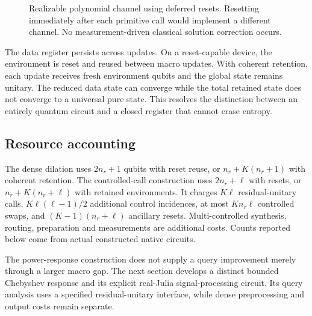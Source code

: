 \documentclass{ieeeaccess}
\newcommand{\ket}[1]{\lvert #1\rangle}\newcommand{\bra}[1]{\langle #1\rvert}
\begin{document}
\begin{figure}[!tbp]\centering
{}
\caption{Realizable polynomial channel using deferred resets. Resetting immediately after each primitive call would implement a different channel. No measurement-driven classical solution correction occurs.}\label{fig:architecture}
\end{figure}

The data register persists across updates. On a reset-capable device, the environment is reset and reused between macro updates. With coherent retention, each update receives fresh environment qubits and the global state remains unitary. The reduced data state can converge while the total retained state does not converge to a universal pure state. This resolves the distinction between an entirely quantum circuit and a closed register that cannot erase entropy.

\subsection{Resource accounting}
The dense dilation uses $2n_r+1$ qubits with reset reuse, or $n_r+K(n_r+1)$ with coherent retention. The controlled-call construction uses $2n_r+\ell$ with resets, or $n_r+K(n_r+\ell)$ with retained environments. It charges $K\ell$ residual-unitary calls, $K\ell(\ell-1)/2$ additional control incidences, at most $Kn_r\ell$ controlled swaps, and $(K-1)(n_r+\ell)$ ancillary resets. Multi-controlled synthesis, routing, preparation and measurements are additional costs. Counts reported below come from actual constructed native circuits.

The power-response construction does not supply a query improvement merely through a larger macro gap. The next section develops a distinct bounded Chebyshev response and its explicit real-Julia signal-processing circuit. Its query analysis uses a specified residual-unitary interface, while dense preprocessing and output costs remain separate.
\end{document}
